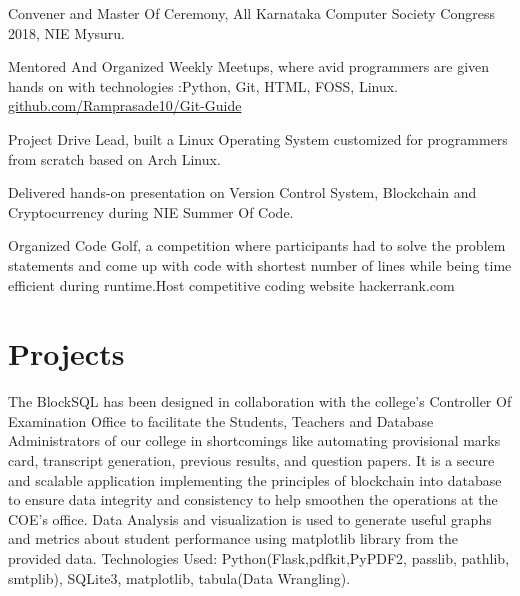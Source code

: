 \documentclass[]{deedy-resume-openfont}
\begin{document}
\begin{tightemize}
\item Convener and Master Of Ceremony, All Karnataka Computer Society Congress 2018, NIE Mysuru.
\item Mentored And Organized Weekly Meetups, where avid programmers are given hands on with
technologies :Python, Git, HTML, FOSS, Linux. \href{https://github.com/Ramprasade10/Git-Guide}{github.com/Ramprasade10/Git-Guide}
\item Project Drive Lead, built a Linux Operating System customized for programmers from scratch based on Arch Linux.
\item Delivered hands-on presentation on Version Control System,  Blockchain and Cryptocurrency during NIE Summer Of Code.
\item Organized Code Golf, a competition where participants had to solve the problem statements and come up with code with shortest number of
lines while being time efficient during runtime.Host competitive coding website hackerrank.com
\end{tightemize}
\sectionsep


\section{Projects}

The BlockSQL has been designed in collaboration with the college's Controller Of Examination Office to facilitate the Students, Teachers and Database Administrators of our college in  shortcomings like automating provisional marks card, transcript generation, previous results, and question papers. It is a secure and scalable application implementing the principles of blockchain into database to ensure data integrity and consistency to help smoothen the operations at the COE’s office.
Data Analysis and visualization is used to generate useful graphs and metrics about student performance using matplotlib library from the provided data.
Technologies Used: Python(Flask,pdfkit,PyPDF2, passlib, pathlib, smtplib), SQLite3, matplotlib, tabula(Data Wrangling).
\sectionsep
\end{document}
